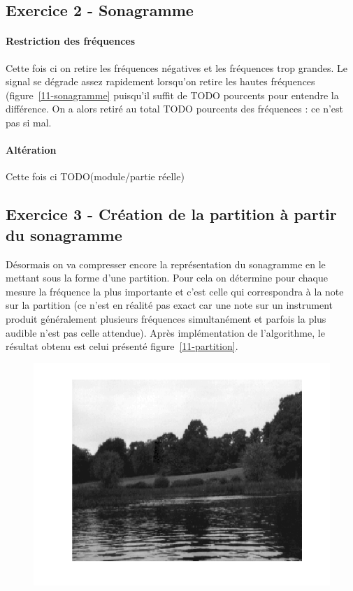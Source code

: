 \documentclass{article}
\begin{document}
\subsection{Exercice 2 - Sonagramme}
\paragraph{Restriction des fréquences}
Cette fois ci on retire les fréquences négatives et les fréquences trop grandes. Le signal se dégrade assez rapidement lorsqu'on retire les hautes fréquences (figure~\ref{11-sonagramme} puisqu'il suffit de TODO pourcents pour entendre la différence. On a alors retiré au total TODO pourcents des fréquences : ce n'est pas si mal.

\paragraph{Altération}
Cette fois ci TODO(module/partie réelle)

\subsection{Exercice 3 - Création de la partition à partir du sonagramme}
Désormais on va compresser encore la représentation du sonagramme en le mettant sous la forme d'une partition. Pour cela on détermine pour chaque mesure la fréquence la plus importante et c'est celle qui correspondra à la note sur la partition (ce n'est en réalité pas exact car une note sur un instrument produit généralement plusieurs fréquences simultanément et parfois la plus audible n'est pas celle attendue). Après implémentation de l'algorithme, le résultat obtenu est celui présenté figure~\ref{11-partition}.

\begin{figure}[!ht]
\includegraphics[width=\textwidth]{images/1/1-1-autumn_b.png}
\end{figure}
\end{document}
